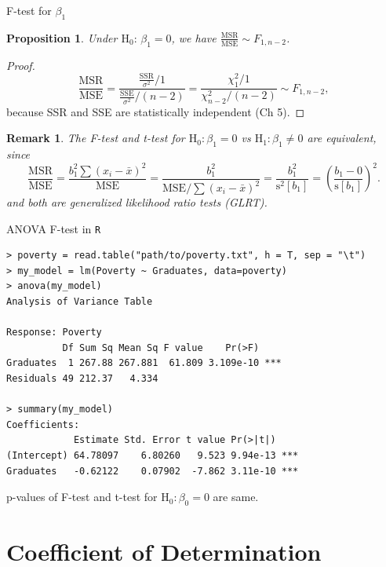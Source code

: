 \documentclass{beamer}
\newcommand{\s}{\mathrm{s}}
\newtheorem{prop}[theorem]{Proposition}
\newtheorem{remark}{Remark}
\begin{document}
\begin{frame}{F-test for $\beta_1$}
\begin{prop}
Under $\text{H}_0:\,\beta_1=0$, we have $\frac{\text{MSR}}{\text{MSE}}\sim F_{1,n-2}$.
\end{prop}
\pause\begin{proof}
$$\frac{\text{MSR}}{\text{MSE}}=\frac{\frac{\text{SSR}}{\sigma^2}/1}{\frac{\text{SSE}}{\sigma^2}/(n-2)}=\frac{\chi^2_1/1}{\chi^2_{n-2}/(n-2)}\sim F_{1,n-2},$$
\pause because SSR and SSE are statistically independent (Ch 5).
\end{proof}
\pause\begin{remark}
The F-test and t-test for $\text{H}_0:\beta_1=0$ vs $\text{H}_1:\beta_1\ne0$ are equivalent, since\pause
$$
\frac{\text{MSR}}{\text{MSE}}=\frac{b_1^2\sum(x_i-\bar{x})^2}{\text{MSE}}=\frac{b_1^2}{\text{MSE}/\sum(x_i-\bar{x})^2}=\frac{b_1^2}{\s^2[b_1]}=\left(\frac{b_1-0}{\s[b_1]}\right)^2.
$$
\pause and both are generalized likelihood ratio tests (GLRT).
\end{remark}
\end{frame}

\begin{frame}[fragile]{ANOVA F-test in \texttt{R}}
\begin{small}
\begin{verbatim}
> poverty = read.table("path/to/poverty.txt", h = T, sep = "\t")
> my_model = lm(Poverty ~ Graduates, data=poverty)
> anova(my_model)
Analysis of Variance Table

Response: Poverty
          Df Sum Sq Mean Sq F value    Pr(>F)    
Graduates  1 267.88 267.881  61.809 3.109e-10 ***
Residuals 49 212.37   4.334               

> summary(my_model)
Coefficients:
            Estimate Std. Error t value Pr(>|t|)    
(Intercept) 64.78097    6.80260   9.523 9.94e-13 ***
Graduates   -0.62122    0.07902  -7.862 3.11e-10 ***
\end{verbatim}
\end{small}
\pause p-values of F-test and t-test for $\text{H}_0:\beta_0=0$ are same.
\end{frame}

\section{Coefficient of Determination}
\end{document}

